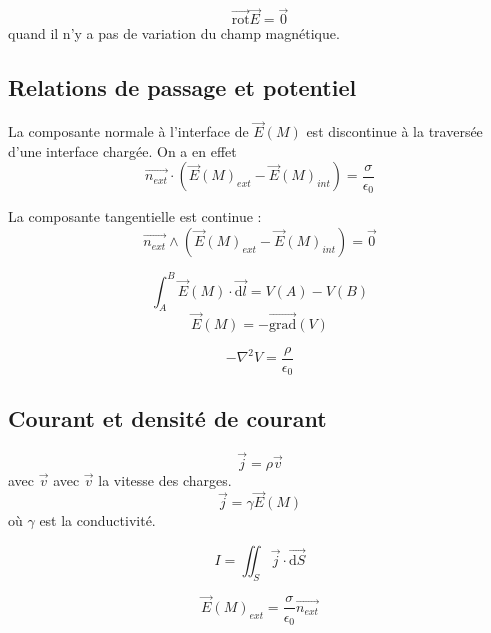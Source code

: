 \documentclass[french]{yLectureNote}
\renewcommand{\vec}{\overrightarrow}
\renewcommand{\vec}{\overrightarrow}
\newcommand{\dd}[0]{\mathrm{d}}
\newcommand{\E}{\vec{E}(M)}
\newcommand{\rot}{\vec{\mathrm{rot}}}
\newcommand{\grad}{\vec{\mathrm{grad}}}
\newcommand{\lap}{\nabla^2}
\begin{document}
\begin{theorem}
    $$\rot\vec{E} = \vec{0}$$ quand il n'y a pas de variation du champ magnétique.

\end{theorem}

\subsection{Relations de passage et potentiel}

\begin{theorem}
La composante normale à l'interface de $\E$ est discontinue à la traversée d'une interface chargée. On a en effet $$\vec{n_{ext}}\cdot (\E_{ext}-\E_{int}) = \frac{\sigma}{\epsilon_0}$$

La composante tangentielle est continue :$$\vec{n_{ext}}\wedge (\E_{ext}-\E_{int}) = \vec{0}$$ 

\end{theorem}

\begin{theorem}
    $$\int_A^B \E \cdot \vec{\dd l} = V(A)-V(B)$$
    $$ \E = -\grad(V)$$

\end{theorem}

\begin{theorem}
   $$-\lap V = \frac{\rho}{\epsilon_0}$$

\end{theorem}

\subsection{Courant et densité de courant}

\begin{definition}
    $$\vec{j} = \rho\vec{v}$$ avec $\vec{v}$ avec $\vec{v}$ la vitesse des charges.
    $$\vec{j} = \gamma \E$$ où $\gamma$ est la conductivité.

\end{definition}

\begin{theorem}
    $$I = \iint_S \vec{j}\cdot \vec{\dd S}$$

\end{theorem}

\begin{theorem}
    $$\E_{ext} = \frac{\sigma}{\epsilon_0}\vec{n_{ext}}$$

\end{theorem}
\end{document}
